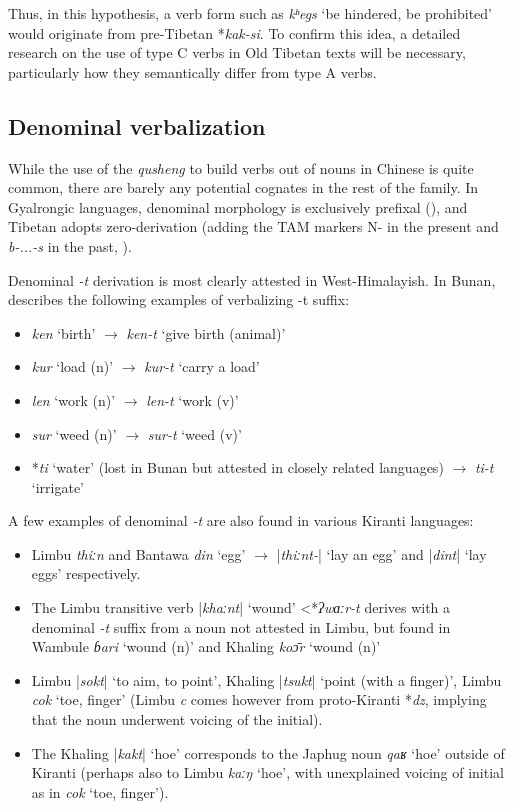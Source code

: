 \documentclass[oneside,a4paper,11pt]{article}
\newcommand{\ipa}[1]{{\phon\textit{\mbox{#1}}}}
\newcommand{\dhatu}[2]{|\ipa{#1}| `#2'}
\begin{document}
Thus, in this hypothesis, a verb form such as \ipa{kʰegs} ‘be hindered, be prohibited’ would originate from pre-Tibetan *\ipa{kak-si}. To confirm this idea, a detailed research on the use of type C verbs in Old Tibetan texts will be necessary, particularly how they semantically differ from type A verbs.

 
\subsection{Denominal verbalization}
While the use of the \textit{qusheng} to build verbs out of nouns in Chinese is quite common, there are barely any potential cognates in the rest of the family. In Gyalrongic languages, denominal morphology is exclusively prefixal (\citealt{jacques14antipassive}), and Tibetan adopts zero-derivation (adding the TAM markers N- in the present and \textit{b-...-s} in the past, \citealt[29]{jacques14esquisse}). 


Denominal \ipa{-t} derivation is most clearly attested in West-Himalayish. In Bunan, \citet[426]{widmer14bunan} describes the following examples of verbalizing -t suffix: 

\begin{itemize}
\item \ipa{ken} `birth' $\rightarrow$ \ipa{ken-t} `give birth (animal)'
\item \ipa{kur} `load (n)' $\rightarrow$ \ipa{kur-t} `carry a load'
\item \ipa{len} `work (n)' $\rightarrow$ \ipa{len-t} `work (v)'
\item \ipa{sur} `weed (n)' $\rightarrow$ \ipa{sur-t} `weed (v)'
\item *\ipa{ti} `water' (lost in Bunan but attested in closely related languages) $\rightarrow$ \ipa{ti-t} `irrigate'
\end{itemize}

A few examples of denominal \ipa{-t} are also found in various Kiranti languages:
\begin{itemize}
\item Limbu \ipa{thiːn} and Bantawa \ipa{din} `egg' $\rightarrow$ \dhatu{thiːnt-}{lay an egg} and \dhatu{dint}{lay eggs} respectively.  
\item The Limbu transitive verb \dhatu{khaːnt}{wound} <*\ipa{ʔwɑːr-t} derives with a denominal \ipa{-t} suffix from a noun not attested in Limbu, but found in Wambule \ipa{ɓari} `wound (n)' and Khaling \ipa{koɔ̄r} `wound (n)'
 \item Limbu \dhatu{sokt}{to aim, to point}, Khaling \dhatu{tsukt}{point (with a finger)}, Limbu \ipa{cok} `toe, finger' (Limbu \ipa{c} comes however from proto-Kiranti *\ipa{dz}, implying that the noun underwent voicing of the initial).
 \item The Khaling \dhatu{kakt}{hoe} corresponds to the Japhug noun \ipa{qaʁ} `hoe' outside of Kiranti (perhaps also to Limbu \ipa{kaːŋ} `hoe', with unexplained voicing of initial as in \ipa{cok} `toe, finger').
\end{itemize}
\end{document}
